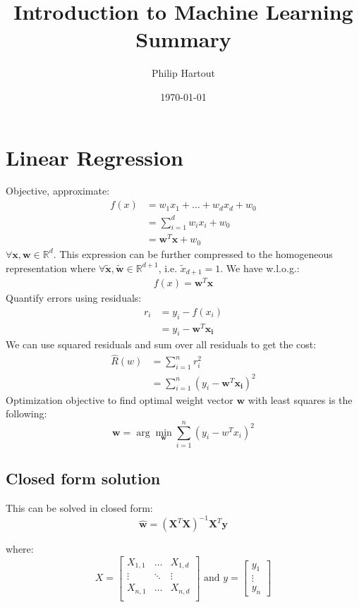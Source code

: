 \documentclass[a4paper,10pt,twoside]{article}
\title{Introduction to Machine Learning \\ Summary}
\author{Philip Hartout}
\date{\today}
\begin{document}
\maketitle

\tableofcontents


\section{Linear Regression}
Objective, approximate:
\begin{align*}
    f(x) &= w_1x_1+\ldots+w_dx_d+w_0\\
        &= \sum_{i=1}^{d}w_ix_i+w_0\\
        &= \mathbf{w}^{T}\mathbf{x}+w_0
\end{align*}
$\forall \mathbf{x}, \mathbf{w}\in\mathbb{R}^{d}$. This expression can be further compressed to the homogeneous representation where $\forall \mathbf{\tilde{x}}, \mathbf{\tilde{w}}\in\mathbb{R}^{d+1}$, i.e. $\tilde{x}_{d+1}=1$. We have w.l.o.g.:
\begin{align*}
f(x) = \mathbf{w}^{T}\mathbf{x}
\end{align*}
Quantify errors using residuals:
\begin{align*}
    r_i &= y_i-f(x_i)\\
        &= y_i-\mathbf{w}^{T}\mathbf{x_i}
\end{align*}
We can use squared residuals and sum over all residuals to get the cost:
\begin{align}
    \label{objective_lse}
    \hat{R}(w) &= \sum_{i=1}^{n}r_i^2\\
               &= \sum_{i=1}^{n}(y_i-\mathbf{w}^{T}\mathbf{x_i})^2
\end{align}
Optimization objective to find optimal weight vector $\mathbf{w}$ with least squares is the following:
\begin{equation*}
    \mathbf{w} = \arg\min_{\mathbf{w}}\displaystyle\sum_{i=1}^{n}\left(y_i-w^{T}x_i\right)^2
\end{equation*}

\subsection{Closed form solution}
This can be solved in closed form:
\begin{equation*}
    \mathbf{\hat{w}} = (\mathbf{X}^{T}\mathbf{X})^{-1}\mathbf{X}^{T}\mathbf{y}
\end{equation*}

where:
\begin{equation*}
    X =
    \begin{bmatrix}
        X_{1,1} & \ldots & X_{1,d}\\
        \vdots & \ddots & \vdots\\
        X_{n,1} & \ldots & X_{n,d}\\
    \end{bmatrix}
    \text{ and }
    y =
    \begin{bmatrix}
        y_{1} \\
        \vdots \\
        y_{n}
    \end{bmatrix}
\end{equation*}
\end{document}
